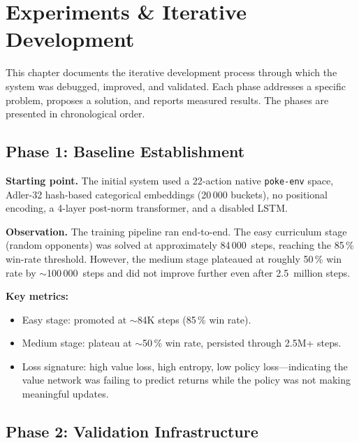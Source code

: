 \chapter{Experiments \& Iterative Development}
\label{ch:experiments}

This chapter documents the iterative development process through which the
system was debugged, improved, and validated.  Each phase addresses a specific
problem, proposes a solution, and reports measured results.  The phases are
presented in chronological order.

\section{Phase 1: Baseline Establishment}

\textbf{Starting point.} The initial system used a 22-action native
\texttt{poke-env} space, Adler-32 hash-based categorical embeddings (20\,000
buckets), no positional encoding, a 4-layer post-norm transformer, and a
disabled LSTM.

\textbf{Observation.} The training pipeline ran end-to-end.  The easy
curriculum stage (random opponents) was solved at approximately 84\,000~steps,
reaching the 85\,\% win-rate threshold.  However, the medium stage plateaued at
roughly 50\,\% win rate by $\sim$100\,000~steps and did not improve further
even after 2.5~million steps.

\textbf{Key metrics:}
\begin{itemize}
  \item Easy stage: promoted at $\sim$84K steps (85\,\% win rate).
  \item Medium stage: plateau at $\sim$50\,\% win rate, persisted through 2.5M+ steps.
  \item Loss signature: high value loss, high entropy, low policy loss---indicating
        the value network was failing to predict returns while the policy was not
        making meaningful updates.
\end{itemize}


\section{Phase 2: Validation Infrastructure}


